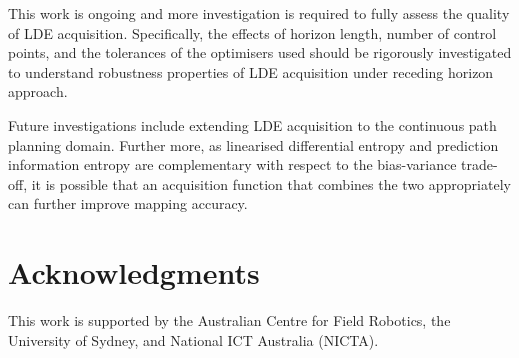 \documentclass{article}
\begin{document}
	This work is ongoing and more investigation is required to fully assess the quality of LDE acquisition. Specifically, the effects of horizon length, number of control points, and the tolerances of the optimisers used should be rigorously investigated to understand robustness properties of LDE acquisition under receding horizon approach.
	
	Future investigations include extending LDE acquisition to the continuous path planning domain. Further more, as linearised differential entropy and prediction information entropy are complementary with respect to the bias-variance trade-off, it is possible that an acquisition function that combines the two appropriately can further improve mapping accuracy.
	
\section*{Acknowledgments}

	This work is supported by the Australian Centre for Field Robotics, the University of Sydney, and National ICT Australia (NICTA).
	
%
%



\end{document}
